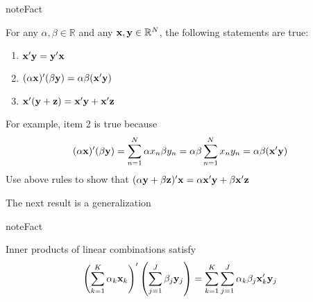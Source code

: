 \documentclass[letterpaper,10pt,english]{jupyterBook}
\begin{document}
\begin{sphinxadmonition}{note}{Fact}

\sphinxAtStartPar
For any \(\alpha, \beta \in \mathbb{R}\) and any \({\bf x}, {\bf y} \in \mathbb{R}^N\), the following statements are true:
\begin{enumerate}
%
\item {} 
\sphinxAtStartPar
\({\bf x}' {\bf y} = {\bf y}' {\bf x}\)

\item {} 
\sphinxAtStartPar
\((\alpha {\bf x})' (\beta {\bf y}) = \alpha \beta ({\bf x}' {\bf y})\)

\item {} 
\sphinxAtStartPar
\({\bf x}' ({\bf y} + {\bf z}) = {\bf x}' {\bf y} + {\bf x}' {\bf z}\)

\end{enumerate}
\end{sphinxadmonition}

\sphinxAtStartPar
For example, item 2 is true because
\begin{equation*}
\begin{split}
%
(\alpha {\bf x})' (\beta {\bf y}) 
= \sum_{n=1}^N \alpha x_n \beta y_n
= \alpha \beta \sum_{n=1}^N x_n y_n
= \alpha \beta ({\bf x}' {\bf y})
%
\end{split}
\end{equation*}
\sphinxAtStartPar
{} Use above rules to show that
\((\alpha {\bf y} + \beta {\bf z})'{\bf x} = \alpha {\bf x}' {\bf y} + \beta {\bf x}' {\bf z}\)

\sphinxAtStartPar
The next result is a generalization

\begin{sphinxadmonition}{note}{Fact}

\sphinxAtStartPar
Inner products of linear combinations satisfy
\begin{equation*}
\begin{split}
%
\left(
\sum_{k=1}^K \alpha_k {\bf x}_k
\right)' 
\left(
\sum_{j=1}^J \beta_j {\bf y}_j 
\right)
=
\sum_{k=1}^K \sum_{j=1}^J \alpha_k \beta_j {\bf x}_k' {\bf y}_j 
%
\end{split}
\end{equation*}\end{sphinxadmonition}
\end{document}

